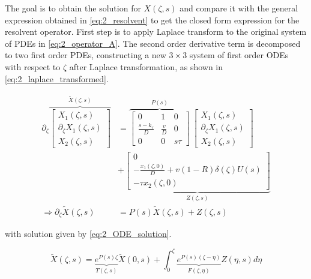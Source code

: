     The goal is to obtain the solution for ${X}(\zeta, s)$ and compare it with the general expression obtained in \eqref{eq:2_resolvent} to get the closed form expression for the resolvent operator. First step is to apply Laplace transform to the original system of PDEs in \eqref{eq:2_operator_A}. The second order derivative term is decomposed to two first order PDEs, constructing a new $3 \times 3$ system of first order ODEs with respect to $\zeta$ after Laplace transformation, as shown in \eqref{eq:2_laplace_transformed}.
    
    \begin{equation} \label{eq:2_laplace_transformed}
    \begin{aligned}
        \partial_\zeta \overbrace{\begin{bmatrix}
            X_1(\zeta,s)\\ \partial_\zeta X_1(\zeta,s)\\ X_2(\zeta,s)
        \end{bmatrix}}^{{\tilde{X}}(\zeta,s)} &= \overbrace{\begin{bmatrix}
            0 & 1 & 0\\
            \frac{s-k_r}{D} & \frac{v}{D} & 0\\
            0 & 0 & s\tau
            \end{bmatrix}}^{P(s)} \, \begin{bmatrix}
                X_1(\zeta,s)\\ \partial_\zeta X_1(\zeta,s)\\ X_2(\zeta,s)
            \end{bmatrix} \\
            &+ \underbrace{\begin{bmatrix}
                0\\ -\frac{x_1(\zeta,0)}{D} + v(1-R) \delta(\zeta) U(s)\\ -\tau x_2(\zeta,0)
            \end{bmatrix}}_{Z(\zeta,s)} \\
            \Rightarrow \partial_\zeta {\tilde{X}}(\zeta,s) &= P(s) {\tilde{X}}(\zeta,s) + Z(\zeta,s)
    \end{aligned}
    \end{equation} 
    
    with solution given by \eqref{eq:2_ODE_solution}.
    
    \begin{equation} \label{eq:2_ODE_solution}
        {\tilde{X}}(\zeta,s) = \underbrace{e^{P(s)\zeta}}_{T(\zeta,s)} {\tilde{X}}(0,s) + \int_0^\zeta \underbrace{e^{P(s)(\zeta - \eta)}}_{F(\zeta, \eta)} Z(\eta,s) d\eta
    \end{equation}
    
